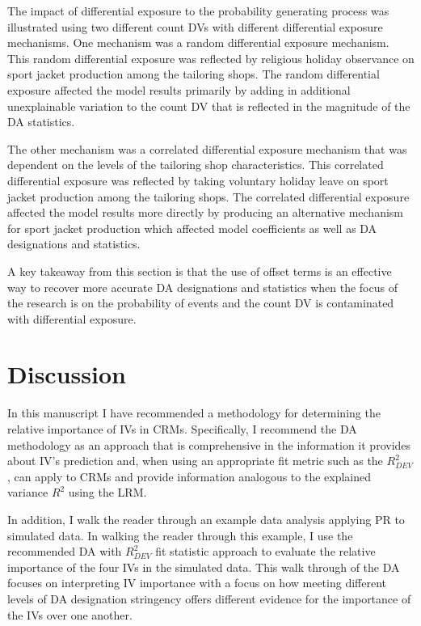 \documentclass[ShortAfour,times,sageapa]{sagej}
\begin{document}
	The impact of differential exposure to the probability generating process was illustrated using two different count DVs with different differential exposure mechanisms.
	One mechanism was a random differential exposure mechanism.
	This random differential exposure was reflected by religious holiday observance on sport jacket production among the tailoring shops.
	The random differential exposure affected the model results primarily by adding in additional unexplainable variation to the count DV that is reflected in the magnitude of the DA statistics.
	
	The other mechanism was a correlated differential exposure mechanism that was dependent on the levels of the tailoring shop characteristics.
	This correlated differential exposure was reflected by taking voluntary holiday leave on sport jacket production among the tailoring shops.
	The correlated differential exposure affected the model results more directly by producing an alternative mechanism for sport jacket production which affected model coefficients as well as DA designations and statistics.
	
	A key takeaway from this section is that the use of offset terms is an effective way to recover more accurate DA designations and statistics when the focus of the research is on the probability of events and the count DV is contaminated with differential exposure.

	
\section{Discussion}

	In this manuscript I have recommended a methodology for determining the relative importance of IVs in CRMs.
	Specifically, I recommend the DA methodology as an approach that is comprehensive in the information it provides about IV's prediction and, when using an appropriate fit metric such as the $R^2_{DEV}$, can apply to CRMs and provide information analogous to the explained variance $R^2$ using the LRM.
	
	In addition, I walk the reader through an example data analysis applying PR to simulated data. 
	In walking the reader through this example, I use the recommended DA with $R^2_{DEV}$ fit statistic approach to evaluate the relative importance of the four IVs in the simulated data.
	This walk through of the DA focuses on interpreting IV importance with a focus on how meeting different levels of DA designation stringency offers different evidence for the importance of the IVs over one another.
	
\end{document}
